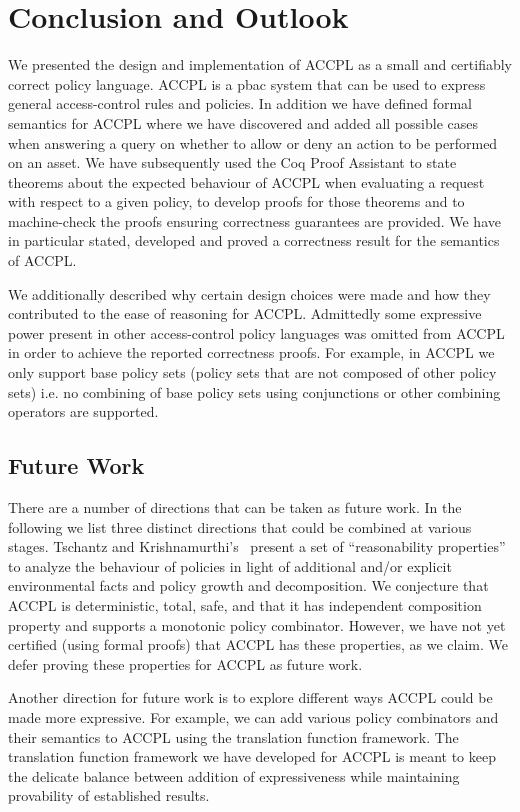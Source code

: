 \documentclass[runningheads,a4paper]{llncs}
\begin{document}
\section{Conclusion and Outlook}
We presented the design and implementation of \ac{ACCPL} as a small and certifiably correct policy language. \ac{ACCPL} is a \ac{pbac} system that can be used to express general access-control rules and policies. In addition we have defined formal semantics for \ac{ACCPL} where we have discovered and added all possible cases when answering a query on whether to allow or deny an action to be performed on an asset. We have subsequently used the Coq Proof Assistant to state theorems about the expected behaviour of \ac{ACCPL} when evaluating a request with respect to a given policy, to develop proofs for those theorems and to machine-check the proofs ensuring correctness guarantees are provided. We have in particular stated, developed and proved a correctness result for the semantics of \ac{ACCPL}. 

We additionally described why certain design choices were made and how they contributed to the ease of reasoning for \ac{ACCPL}. Admittedly some expressive power present in other access-control policy languages was omitted from \ac{ACCPL} in order to achieve the reported correctness proofs. For example, in \ac{ACCPL} we only support base policy sets (policy sets that are not composed of other policy sets) i.e. no combining of base policy sets using conjunctions or other combining operators are supported. 


\subsection{Future Work}

There are a number of directions that can be taken as future work. In the following we list three distinct directions that could be combined at various stages.
Tschantz and Krishnamurthi's~\cite{Tschantz} present a set of ``reasonability properties'' to analyze the behaviour of policies in light of additional and/or explicit environmental facts and policy growth and decomposition. We conjecture that \ac{ACCPL} is deterministic, total, safe, and that it has independent composition property and supports a monotonic policy combinator. However, we have not yet certified (using formal proofs) that \ac{ACCPL} has these properties, as we claim. We defer proving these properties for \ac{ACCPL} as future work. 

Another direction for future work is to explore different ways \ac{ACCPL} could be made more expressive. For example, we can add various policy combinators and their semantics to \ac{ACCPL} using the translation function framework. The translation function framework we have developed for \ac{ACCPL} is meant to keep the delicate balance between addition of expressiveness while maintaining provability of established results.
\end{document}
